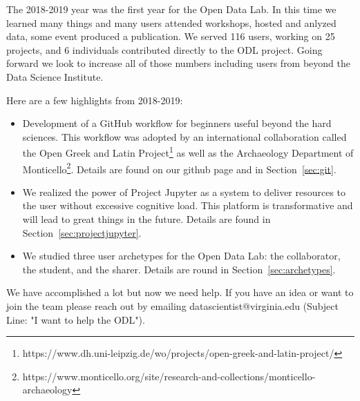 The 2018-2019 year was the first year for the Open Data Lab. In this time we learned many things and many users attended workshops, hosted and anlyzed data, some event produced a publication. We served 116 users, working on 25 projects, and 6 individuals contributed directly to the ODL project. Going forward we look to increase all of those numbers including users from beyond the Data Science Institute.

Here are a few highlights from 2018-2019:
\begin{itemize}
\item Development of a GitHub workflow for beginners useful beyond the hard sciences. This workflow was adopted by an international collaboration called the Open Greek and Latin Project\footnote{https://www.dh.uni-leipzig.de/wo/projects/open-greek-and-latin-project/} as well as the Archaeology Department of Monticello\footnote{https://www.monticello.org/site/research-and-collections/monticello-archaeology}. Details are found on our github page and in Section~\ref{sec:git}.
\item We realized the power of Project Jupyter as a system to deliver resources to the user without excessive cognitive load. This platform is transformative and will lead to great things in the future. Details are found in Section~\ref{sec:projectjupyter}.
\item We studied three user archetypes for the Open Data Lab: the collaborator, the student, and the sharer. Details are round in Section~\ref{sec:archetypes}.
\end{itemize}

We have accomplished a lot but now we need help. If you have an idea or want to join the team please reach out by emailing datascientist@virginia.edu (Subject Line: "I want to help the ODL").

